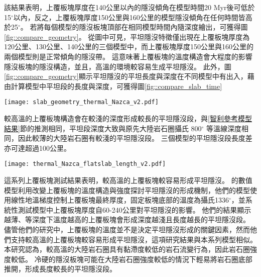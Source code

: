 該結果表明，上覆板塊厚度在140公里以內的隱沒傾角在模型時間20 Myr後可低於15$^\circ$以內，反之，上覆板塊厚度150公里與160公里的模型隱沒傾角在任何時間皆高於25$^\circ$。
若將每個模型的隱沒板塊頂部在相同模型時間內隨深度繪出，可獲得圖\ref{fig::compare_geometry}。
從圖中可見，平坦隱沒特徵僅出現在上覆板塊厚度為120公里、130公里、140公里的三個模型中，而上覆板塊厚度150公里與160公里的兩個模型則是正常傾角的隱沒帶。
這意味著上覆板塊的溫度構造會大程度的影響隱沒板塊的隱沒構造，並且，高溫的環境較容易生成平坦隱沒。
此外，圖\ref{fig::compare_geometry}顯示平坦隱沒的平坦長度與深度在不同模型中有出入，藉由計算模型中平坦段的長度與深度，可獲得圖\ref{fig::compare_slab_time}

\begin{figure*}[ht!]
    \centering
    \texttt{[image: slab\_geometry\_thermal\_Nazca\_v2.pdf]}
    \caption[測試上覆板塊厚度模型在40 Myr的隱沒板塊構造]{測試上覆板塊厚度模型在40 Myr時隱沒板塊於150公里以上之構造，幾何形狀取自隱沒板塊頂部，使用5公里移動平均平滑離散化的網格，模型與圖\ref{fig::compare_dip_thermal}所使用的圖例相同。}
    \label{fig::compare_geometry}
\end{figure*}

較高溫的上覆板塊構造會在較淺的深度形成較長的平坦隱沒段，與\ref{智利參考模型結果}節的推測相同，平坦段深度大致與原先大陸岩石圈攝氏 800$^\circ$ 等溫線深度相同，因此較薄的大陸岩石圈有較淺的平坦隱沒段。
三個模型的平坦隱沒段長度差亦可達超過100公里。

\begin{figure*}[ht!]
    \centering
    \texttt{[image: thermal\_Nazca\_flatslab\_length\_v2.pdf]}
    \caption[測試上覆板塊厚度模型的平坦段長度與深度]{測試上覆板塊厚度模型的平坦段(a)長度與(b)深度。模型與圖\ref{fig::compare_dip_thermal}所使用的圖例相同。}
    \label{fig::compare_slab_time}
\end{figure*}

這系列上覆板塊測試結果表明，較高溫的上覆板塊較容易形成平坦隱沒。
\citet{liu2019influence}的數值模型利用改變上覆板塊的溫度構造與強度探討平坦隱沒的形成機制，他們的模型使用線性地溫梯度控制上覆板塊最終厚度，固定板塊底部的溫度為攝氏1336$^\circ$，並系統性測試模型中上覆板塊厚度自60-240公里對平坦隱沒的影響。
他們的結果顯示越薄、等深度下溫度越高的上覆板塊會形成深度越淺且長度越長的平坦隱沒段。
儘管他們的研究中，上覆板塊的溫度並不是決定平坦隱沒形成的關鍵因素，然而他們支持較高溫的上覆板塊較容易形成平坦隱沒，這項研究結果與本系列模型相似。
本研究認為，較高溫的大陸岩石圈具有黏滯度較低的岩石流變行為，因此岩石圈強度較低。
冷硬的隱沒板塊可能在大陸岩石圈強度較低的情況下輕易將岩石圈底部推開，形成長度較長的平坦隱沒段。

